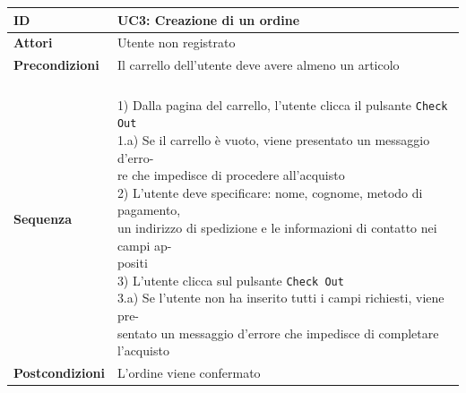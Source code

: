 \documentclass[12pt,a4paper]{article}
\begin{document}
	\begin{tabular}{|l|l|}
		\hline
		\textbf{ID} & UC3: Creazione di un ordine\\
		\hline
		\textbf{Attori} & Utente non registrato\\
		\hline
		\textbf{Precondizioni} & \makecell[l]{Il carrello dell'utente deve avere almeno un articolo\vspace{5px}\\}\\
		\hline
		\textbf{Sequenza} & \makecell[l]{\\1) Dalla pagina del carrello, l'utente clicca il pulsante \texttt{Check Out}\\
			\quad\quad1.a) Se il carrello è vuoto, viene presentato un messaggio d'erro-\\\quad\quad re che impedisce di procedere all'acquisto\vspace{5px}\\
			2) L'utente deve specificare: nome, cognome, metodo di pagamento,\\un indirizzo di spedizione e le informazioni di contatto nei campi ap-\\positi \vspace{5px}\\
			3) L'utente clicca sul pulsante \texttt{Check Out}\vspace{5px}\\
			\quad\quad 3.a) Se l'utente non ha inserito tutti i campi richiesti, viene pre-\\\quad\quad sentato un messaggio d'errore che impedisce di completare \\\quad\quad l'acquisto\vspace{5px}\\}\\
		\hline
		\textbf{Postcondizioni} & L'ordine viene confermato\\
		\hline
	\end{tabular}
	\vspace{20px}
	\newpage
\end{document}
